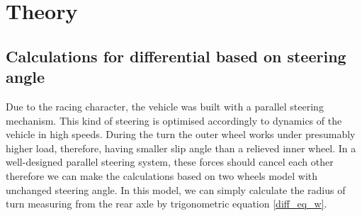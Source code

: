 




\chapter{Theory}

\section{Calculations for differential based on steering angle} \label{diff_calc}

Due to the racing character, the vehicle was built with a parallel steering mechanism. This kind of steering is optimised accordingly to dynamics of the vehicle in high speeds. During the turn the outer wheel works under presumably higher load, therefore, having smaller slip angle than a relieved inner wheel. In a well-designed parallel steering system, these forces should cancel each other therefore we can make the calculations based on two wheels model with unchanged steering angle.\cite{vehicle_dyna}
In this model, we can simply calculate the radius of turn measuring from the rear axle by trigonometric equation \ref{diff_eq_w}.

